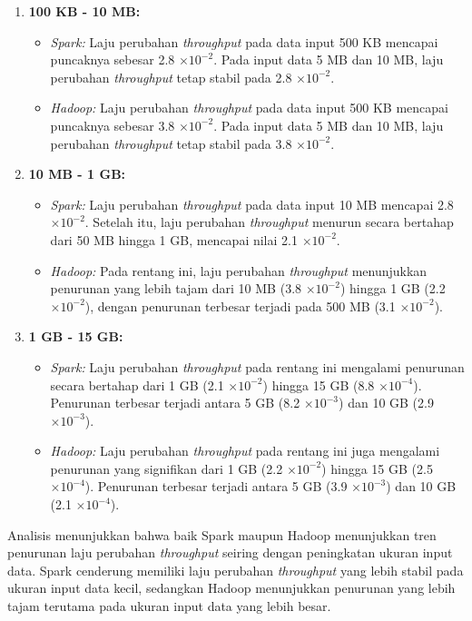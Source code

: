 \begin{enumerate}
\item \textbf{100 KB - 10 MB:}
\begin{itemize}
\item \textit{Spark:} Laju perubahan \textit{throughput} pada data input 500 KB mencapai puncaknya sebesar 2.8 $\times 10^{-2}$. Pada input data 5 MB dan 10 MB, laju perubahan \textit{throughput} tetap stabil pada 2.8 $\times 10^{-2}$.
\item \textit{Hadoop:} Laju perubahan \textit{throughput} pada data input 500 KB mencapai puncaknya sebesar 3.8 $\times 10^{-2}$. Pada input data 5 MB dan 10 MB, laju perubahan \textit{throughput} tetap stabil pada 3.8 $\times 10^{-2}$.
\end{itemize}
\item \textbf{10 MB - 1 GB:}
\begin{itemize}
    \item \textit{Spark:} Laju perubahan \textit{throughput} pada data input 10 MB mencapai 2.8 $\times 10^{-2}$. Setelah itu, laju perubahan \textit{throughput} menurun secara bertahap dari 50 MB hingga 1 GB, mencapai nilai 2.1 $\times 10^{-2}$.
    \item \textit{Hadoop:} Pada rentang ini, laju perubahan \textit{throughput} menunjukkan penurunan yang lebih tajam dari 10 MB (3.8 $\times 10^{-2}$) hingga 1 GB (2.2 $\times 10^{-2}$), dengan penurunan terbesar terjadi pada 500 MB (3.1 $\times 10^{-2}$).
\end{itemize}

\item \textbf{1 GB - 15 GB:}
\begin{itemize}
    \item \textit{Spark:} Laju perubahan \textit{throughput} pada rentang ini mengalami penurunan secara bertahap dari 1 GB (2.1 $\times 10^{-2}$) hingga 15 GB (8.8 $\times 10^{-4}$). Penurunan terbesar terjadi antara 5 GB (8.2 $\times 10^{-3}$) dan 10 GB (2.9 $\times 10^{-3}$).
    \item \textit{Hadoop:} Laju perubahan \textit{throughput} pada rentang ini juga mengalami penurunan yang signifikan dari 1 GB (2.2 $\times 10^{-2}$) hingga 15 GB (2.5 $\times 10^{-4}$). Penurunan terbesar terjadi antara 5 GB (3.9 $\times 10^{-3}$) dan 10 GB (2.1 $\times 10^{-4}$).
\end{itemize}
\end{enumerate}

Analisis menunjukkan bahwa baik Spark maupun Hadoop menunjukkan tren penurunan laju perubahan \textit{throughput} seiring dengan peningkatan ukuran input data. Spark cenderung memiliki laju perubahan \textit{throughput} yang lebih stabil pada ukuran input data kecil, sedangkan Hadoop menunjukkan penurunan yang lebih tajam terutama pada ukuran input data yang lebih besar.\\

